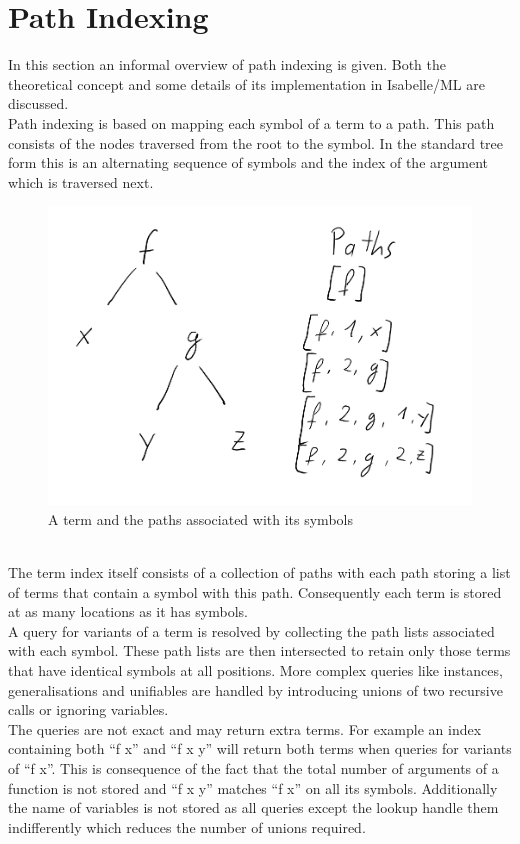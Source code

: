\chapter{Path Indexing}
In this section an informal overview of path indexing is given. Both the theoretical concept and some details of its implementation in Isabelle/ML are discussed.\\
Path indexing is based on mapping each symbol of a term to a path. This path consists of the nodes traversed from the root to the symbol. In the standard tree form this is an alternating sequence of symbols and the index of the argument which is traversed next.\\
\begin{figure}[h]
\centering
\includegraphics[scale=0.25]{figures/term_path.png}
\caption{A term and the paths associated with its symbols}
\end{figure}\\
The term index itself consists of a collection of paths with each path storing a list of terms that contain a symbol with this path. Consequently each term is stored at as many locations as it has symbols.\\
A query for variants of a term is resolved by collecting the path lists associated with each symbol. These path lists are then intersected to retain only those terms that have identical symbols at all positions. More complex queries like instances, generalisations and unifiables are handled by introducing unions of two recursive calls or ignoring variables.\\
The queries are not exact and may return extra terms. For example an index containing both ``f x'' and ``f x y'' will return both terms when queries for variants of ``f x''. This is consequence of the fact that the total number of arguments of a function is not stored and ``f x y'' matches ``f x'' on all its symbols. Additionally the name of variables is not stored as all queries except the lookup handle them indifferently which reduces the number of unions required.\\
